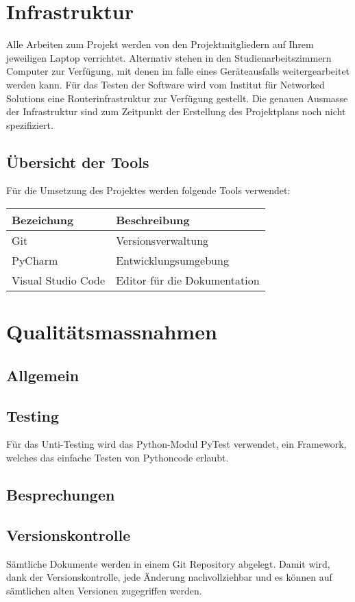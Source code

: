 \documentclass[
	ngerman,
	toc=listof, %
	toc=bibliography, %
	footnotes=multiple, %
	parskip=half, %
	numbers=noendperiod %
]{scrartcl}
\begin{document}
\section{Infrastruktur}
	Alle Arbeiten zum Projekt werden von den Projektmitgliedern auf Ihrem jeweiligen Laptop verrichtet.
	Alternativ stehen in den Studienarbeitszimmern Computer zur Verfügung, mit denen im falle eines Geräteausfalls weitergearbeitet werden kann.
	Für das Testen der Software wird vom Institut für Networked Solutions eine Routerinfrastruktur zur Verfügung gestellt.
	Die genauen Ausmasse der Infrastruktur sind zum Zeitpunkt der Erstellung des Projektplans noch nicht spezifiziert.
	

	\subsection{Übersicht der Tools}
		Für die Umsetzung des Projektes werden folgende Tools verwendet: \\[2ex]
		\begin{tabularx}{0.9\linewidth}{lX}
			\toprule
			Bezeichung & Beschreibung \\
			\midrule
			Git & Versionsverwaltung \\
			PyCharm & Entwicklungsumgebung \\
			Visual Studio Code & Editor für die Dokumentation\\
			\bottomrule
		\end{tabularx}

\section{Qualitätsmassnahmen}
	\subsection{Allgemein}

	\subsection{Testing}
		Für das Unti-Testing wird das Python-Modul PyTest verwendet, ein Framework, welches das einfache Testen von Pythoncode erlaubt.

	\subsection{Besprechungen}

	\subsection{Versionskontrolle}
		Sämtliche Dokumente werden in einem Git Repository abgelegt. Damit wird, dank der Versionskontrolle, 
		jede Änderung nachvollziehbar und es können auf sämtlichen alten Versionen zugegriffen werden.
\end{document}
